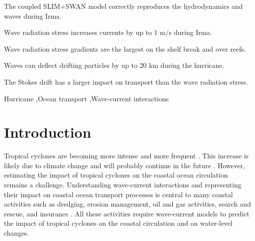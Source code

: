 \documentclass[preprint,12pt,authoryear]{elsarticle}
\begin{document}
\begin{frontmatter}

    \begin{highlights}
        \item The coupled SLIM+SWAN model correctly reproduces the hydrodynamics and waves during Irma.
	    \item Wave radiation stress increases currents by up to 1 m/s during Irma.
	    \item Wave radiation stress gradients are the largest on the shelf break and over reefs. 
	    \item Waves can deflect drifting particles by up to 20 km during the hurricane.
	    \item The Stokes drift has a larger impact on transport than the wave radiation stress.
    \end{highlights}

    \begin{keyword}
        Hurricane \sep Ocean transport \sep Wave-current interactions



    \end{keyword}

\end{frontmatter}

\linenumbers

\section{Introduction}

Tropical cyclones are becoming more intense and more frequent \citep{bhatia2019recent, kossin2020global}. This increase is likely due to climate change and will probably continue in the future \citep{knutson2020tropical}. However, estimating the impact of tropical cyclones on the coastal ocean circulation remains a challenge. Understanding wave-current interactions and representing their impact on coastal ocean transport processes is central to many coastal activities such as dredging, erosion management, oil and gas activities, search and rescue, and insurance \citep{bever2013simulating,li1998three, breivik2013advances}. All these activities require wave-current models to predict the impact of tropical cyclones on the coastal circulation and on water-level changes.
\end{document}
